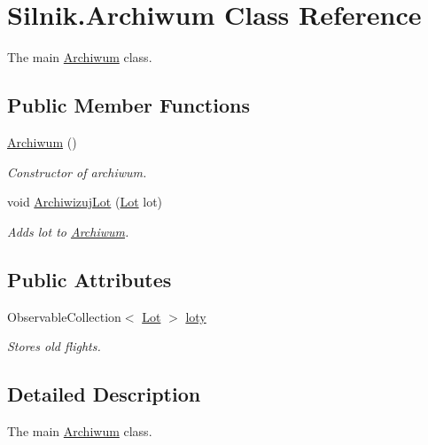 \hypertarget{class_silnik_1_1_archiwum}{}\section{Silnik.\+Archiwum Class Reference}
\label{class_silnik_1_1_archiwum}


The main \mbox{\hyperlink{class_silnik_1_1_archiwum}{Archiwum}} class.  


\subsection*{Public Member Functions}
\begin{DoxyCompactItemize}
\item 
\mbox{\hyperlink{class_silnik_1_1_archiwum_a978b39abcf7b619f1343787959d36731}{Archiwum}} ()
\begin{DoxyCompactList}\small\item\em Constructor of archiwum. \end{DoxyCompactList}\item 
void \mbox{\hyperlink{class_silnik_1_1_archiwum_a55062cd277f767f8f2914561940c132d}{Archiwizuj\+Lot}} (\mbox{\hyperlink{class_silnik_1_1_lot}{Lot}} lot)
\begin{DoxyCompactList}\small\item\em Adds lot to \mbox{\hyperlink{class_silnik_1_1_archiwum}{Archiwum}}. \end{DoxyCompactList}\end{DoxyCompactItemize}
\subsection*{Public Attributes}
\begin{DoxyCompactItemize}
\item 
Observable\+Collection$<$ \mbox{\hyperlink{class_silnik_1_1_lot}{Lot}} $>$ \mbox{\hyperlink{class_silnik_1_1_archiwum_adbd91fcc4f5c9910b1996fde639518ae}{loty}}
\begin{DoxyCompactList}\small\item\em Stores old flights. \end{DoxyCompactList}\end{DoxyCompactItemize}


\subsection{Detailed Description}
The main \mbox{\hyperlink{class_silnik_1_1_archiwum}{Archiwum}} class. 



